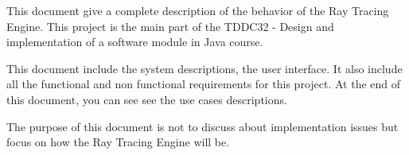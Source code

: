 This document give a complete description of the behavior of the Ray Tracing Engine. This project is the main part of the TDDC32 - Design and implementation of a software module in Java course.

This document include the system descriptions, the user interface. It also include all the functional and non functional requirements for this project. At the end of this document, you can see see the use cases descriptions.

The purpose of this document is not to discuss about implementation issues but focus on how the Ray Tracing Engine will be.

